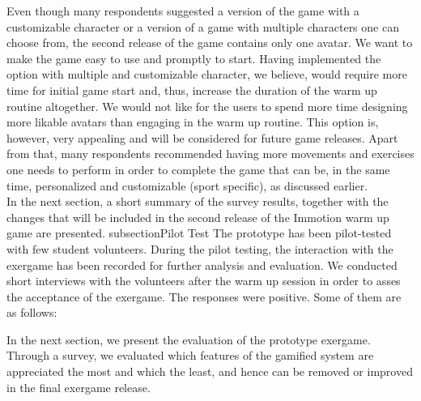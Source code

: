 Even though many respondents suggested a version of the game with a customizable character or a version of a game with multiple characters one can choose from, the second release of the game contains only one avatar. We want to make the game easy to use and promptly to start. Having implemented the option with multiple and customizable character, we believe, would require more time for initial game start and, thus, increase the duration of the warm up routine altogether. We would not like for the users to spend more time designing more likable avatars than engaging in the warm up routine. This option is, however, very appealing and will be considered for future game releases. Apart from that, many respondents recommended having more movements and exercises one needs to perform in order to complete the game that can be, in the same time, personalized and customizable (sport specific), as discussed earlier.\\In the next section, a short summary of the survey results, together with the changes that will be included in the second release of the Immotion warm up game are presented.
subsection{Pilot Test}
The prototype has been pilot-tested with few student volunteers. During the pilot testing, the interaction with the exergame has been recorded for further analysis and evaluation. We conducted short interviews with the volunteers after the warm up session in order to asses the acceptance of the exergame. The responses were positive. Some of them are as follows:

In the next section, we present the evaluation of the prototype exergame. Through a survey, we evaluated which features of the gamified system are appreciated the most and which the least, and hence can be removed or improved in the final exergame release.\
